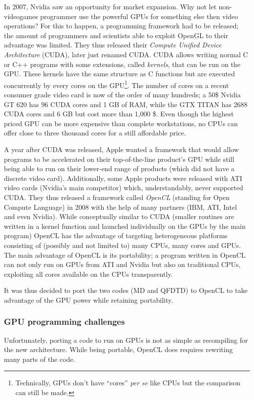 In 2007, Nvidia saw an opportunity for market expansion. Why not let
non-videogames programmer use the powerful GPUs for something else then video
operations? For this to happen, a programming framework had to be released; the
amount of programmers and scientists able to exploit OpenGL to their advantage
was limited. They thus released their \textit{Compute Unified Device
Architecture} (CUDA), later just renamed CUDA. CUDA allows writing normal C or
C++ programs with some extensions, called \textit{kernels}, that can be run on
the GPU. These kernels have the same structure as C functions but are executed
concurrently by every cores on the GPU\footnote{Technically, GPUs don't have
``cores'' \textit{per se} like CPUs but the comparison can still be made.}. The
number of cores on a recent consumer grade video card is now of the order of
many hundreds; a 50\$ Nvidia GT 620 has 96 CUDA cores and 1 GB of RAM, while the
GTX TITAN has 2688 CUDA cores and 6 GB but cost more than 1,000 \$. Even though
the highest priced GPU can be more expensive than complete workstations, no CPUs
can offer close to three thousand cores for a still affordable price.

A year after CUDA was released, Apple wanted a framework that would allow
programs to be accelerated on their top-of-the-line product's GPU while still
being able to run on their lower-end range of products (which did not have a
discrete video card). Additionally, some Apple products were released with ATI
video cards (Nvidia's main competitor) which, understandably, never supported
CUDA. They thus released a framework called \textit{OpenCL} (standing for
Open Compute Language) in 2008 with the help of many partners (IBM, ATI, Intel
and even Nvidia). While conceptually similar to CUDA (smaller routines are
written in a kernel function and launched individually on the GPUs by the main
program) OpenCL has the advantage of targeting heterogeneous platforms
consisting of (possibly and not limited to) many CPUs, many cores and GPUs. The
main advantage of OpenCL is its portability; a program written in OpenCL can
not only run on GPUs from ATI and Nvidia but also on traditional CPUs,
exploiting all cores available on the CPUs transparently.

It was thus decided to port the two codes (MD and QFDTD) to OpenCL to take
advantage of the GPU power while retaining portability.

\subsubsection{GPU programming challenges}
Unfortunately, porting a code to run on GPUs is not as simple as recompiling
for the new architecture. While being portable, OpenCL does requires rewriting
many parts of the code.


